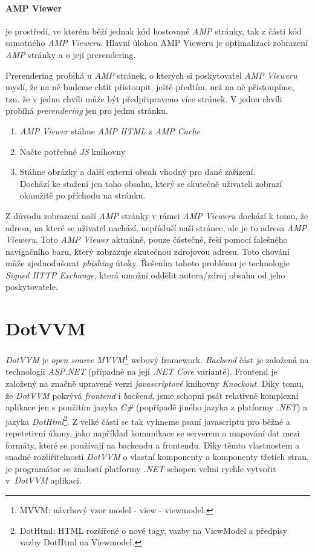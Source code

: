 \subsubsection*{AMP Viewer}
 je prostředí, ve kterém běží jednak kód hostované \emph{AMP} stránky, tak z části kód samotného \emph{AMP Vieweru}. Hlavní úlohou AMP Vieweru je optimalizaci zobrazení \emph{AMP} stránky a o její prerendering.

Prerendering probíhá u \emph{AMP} stránek, o kterých si poskytovatel \emph{AMP Vieweru} myslí, že na ně budeme chtít přistoupit, ještě předtím, než na ně přistoupíme, tzn. že v jednu chvíli může být předpřipraveno více stránek. V jednu chvíli probíhá \emph{prerendering} jen pro jednu stránku. 
\begin{gatger}
\begin{enumerate}
    \item \emph{AMP Viewer} stáhne \emph{AMP HTML} z \emph{AMP Cache}
    \item Načte potřebné \emph{JS} knihovny
    \item Stáhne obrázky a další externí obsah vhodný pro dané zařízení. \\
    Dochází ke stažení jen toho obsahu, který se skutečně uživateli zobrazí okamžitě po příchodu na stránku\cite{ampConf}.
\end{enumerate}
\end{gatger}
Z důvodu zobrazení naší \emph{AMP} stránky v rámci \emph{AMP Vieweru} dochází k tomu, že adresa, na které se uživatel nachází, nepřísluší naší stránce, ale je to adresa \emph{AMP Vieweru}. Toto \emph{AMP Viewer} aktuálně, pouze částečně, řeší pomocí falešného navigačního baru, který zobrazuje skutečnou zdrojovou adresu. Toto chování může zjednodušovat \emph{phishing} útoky\cite[Ch.\ 3, p.\ 50]{VzhuruDoAMP}.
Řešením tohoto problému je technologie \emph{Signed HTTP Exchange}, která umožní oddělit autora/zdroj obsahu od jeho poskytovatele\cite[Ch.\ 3, p.\ 51]{VzhuruDoAMP}.
\chapter{DotVVM}
\emph{DotVVM} je \emph{open source MVVM}\footnote{MVVM: návrhový vzor model - view - viewmodel.} webový framework\cite{DotVVMIntro}. \emph{Backend} část je založená na technologii \emph{ASP.NET} (případně na její \emph{.NET Core} variantě). Frontend je založený na značně upravené verzi \emph{javascriptové} knihovny \emph{Knockout}. Díky tomu, že \emph{DotVVM} pokrývá \emph{frontend} i \emph{backend}, jsme schopni psát relativně komplexní aplikace jen s použitím jazyka \emph{C\#} (popřípadě jiného jazyka z platformy \emph{.NET}) a jazyka \emph{DotHtml}\footnote{DotHtml: HTML rozšířené o nové tagy, vazby na ViewModel a předpisy vazby DotHtml na Viewmodel.}. Z velké části se tak vyhneme psaní javascriptu pro běžné a repetetivní úkony, jako například komunikace se serverem a mapování dat mezi formáty, které se používají na backendu a frontendu.
Díky těmto vlastnostem a snadné rozšiřitelnosti \emph{DotVVM} o vlastní komponenty a komponenty třetích stran, je programátor se znalostí platformy \emph{.NET} schopen velmi rychle vytvořit v~\emph{DotVVM} aplikaci.

